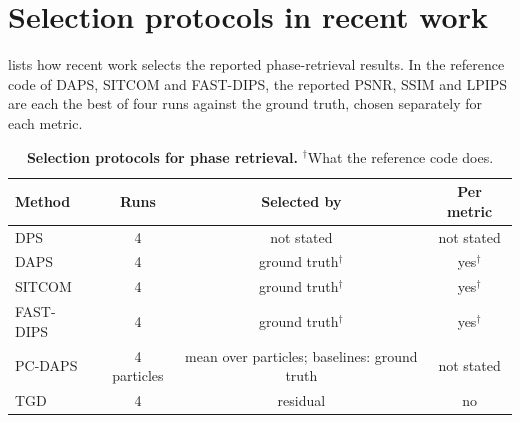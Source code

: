 \section{Selection protocols in recent work}
\label{sec:suppl-protocols}
 lists how recent work selects the reported phase-retrieval results.
In the reference code of DAPS, SITCOM and FAST-DIPS, the reported PSNR, SSIM and LPIPS are each the best of four runs against the ground truth, chosen separately for each metric.

\begin{table}[h]
\centering\small
\setlength{\tabcolsep}{4pt}
\begin{tabular}{@{}lccc@{}}
\toprule
Method & Runs & Selected by & Per metric \\
\midrule
DPS~\cite{chung2023dps} & 4 & not stated & not stated \\
DAPS~\cite{zhang2025daps} & 4 & ground truth$^\dagger$ & yes$^\dagger$ \\
SITCOM~\cite{alkhouri2025sitcom} & 4 & ground truth$^\dagger$ & yes$^\dagger$ \\
FAST-DIPS~\cite{kim2026fastdips} & 4 & ground truth$^\dagger$ & yes$^\dagger$ \\
PC-DAPS~\cite{kocabas2026pcdaps} & 4 particles & mean over particles; baselines: ground truth & not stated \\
TGD~\cite{makris2026tgd} & 4 & residual & no \\
\bottomrule
\end{tabular}
\caption{\textbf{Selection protocols for phase retrieval.} $^\dagger$What the reference code does.}
\label{tab:protocols}
\end{table}
